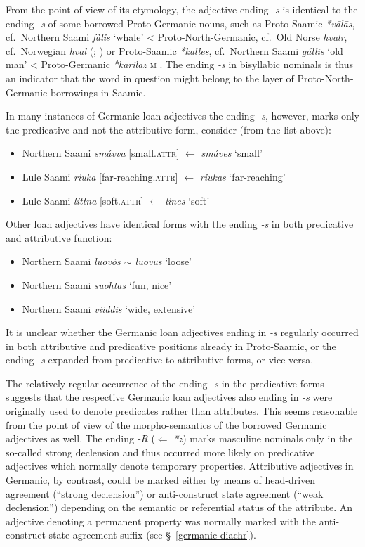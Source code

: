 {From the point of view of its etymology, the adjective ending \textit{-s} is identical to the ending \textit{-s} of some borrowed Proto-Germanic nouns, such as Proto-Saamic \textit{*vālās}, cf.~Northern Saami \textit{fàlis} ‘whale’ < Proto-North-Germanic, cf.~Old Norse \textit{hvalr}, cf.~Norwegian \textit{hval} (\citealt[144]{qvigstad1893}; \citealt[144–145]{lehtiranta1989}) or Proto-Saamic \textit{*kāllēs}, cf.~Northern Saami \textit{gállis} ‘old man’ < Proto-Germanic \textit{*karilaz} \textsc{m} \cite[44–45]{lehtiranta1989}. The ending \textit{-s} in bisyllabic nominals is thus an indicator that the word in question might belong to the layer of Proto-North-Germanic borrowings in Saamic.

In many instances of Germanic loan adjectives the ending \textit{-s}, however, marks only the predicative and not the attributive form, consider (from the list above):
\begin{itemize}
\item Northern Saami \textit{smávva} [small.\textsc{attr}] $\leftarrow$ \textit{smáves} ‘small’
\item Lule Saami \textit{riuka} [far-reaching.\textsc{attr}] $\leftarrow$ \textit{riukas} ‘far-reaching’
\item Lule Saami \textit{littna} [soft.\textsc{attr}] $\leftarrow$ \textit{lines} ‘soft’
\end{itemize}
Other loan adjectives have identical forms with the ending \textit{-s} in both predicative and attributive function:
\begin{itemize}
\item Northern Saami \textit{luov\.{o}s $\sim$ luovus} ‘loose'
\item Northern Saami \textit{suohtas} ‘fun, nice'
\item Northern Saami \textit{viiddis} ‘wide, extensive'
\end {itemize}
It is unclear whether the Germanic loan adjectives ending in \textit{-s} regularly occurred in both attributive and predicative positions already in Proto-Saamic, or the ending \textit{-s} expanded from predicative to attributive forms, or vice versa.

The relatively regular occurrence of the ending \textit{-s} in the predicative forms suggests that the respective Germanic loan adjectives also ending in \textit{-s} were originally used to denote predicates rather than attributes. This seems reasonable from the point of view of the morpho-semantics of the borrowed Germanic adjectives as well. The ending \textit{-R} ($\Leftarrow$ \textit{*z}) marks masculine nominals only in the so-called strong declension and thus occurred more likely on predicative adjectives which normally denote temporary properties. Attributive adjectives in Germanic, by contrast, could be marked either by means of head-driven agreement (“strong declension”) or anti-construct state agreement (“weak declension”) depending on the semantic or referential status of the attribute. An adjective denoting a permanent property was normally marked with the anti-construct state agreement suffix (see \S~\ref{germanic diachr}).

}
